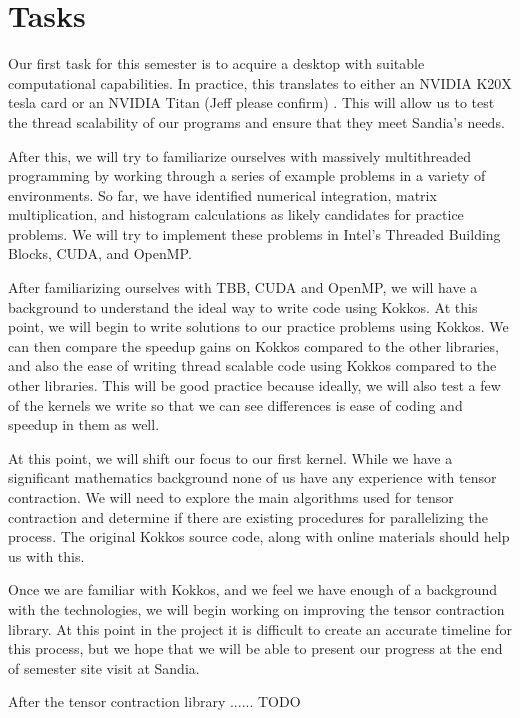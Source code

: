 \documentclass[proposal]{hmcclinic}
\begin{document}

\section{Tasks}

Our first task for this semester is to acquire a desktop with suitable
computational capabilities. In practice, this translates to either an NVIDIA
K20X tesla card or an NVIDIA Titan (Jeff please confirm) . This will allow us to test the thread
scalability of our programs and ensure that they meet Sandia's needs.

After this, we will try to familiarize ourselves with massively multithreaded
programming by working through a series of example problems in a variety of
environments. So far, we have identified numerical integration, matrix
multiplication, and histogram calculations as likely candidates for practice
problems. We will try to implement these problems in Intel's Threaded Building
Blocks, CUDA, and OpenMP.

After familiarizing ourselves with TBB, CUDA and OpenMP, we will have a
background to understand the ideal way to write code using Kokkos. At this
point, we will begin to write solutions to our practice problems using Kokkos.
We can then compare the speedup gains on Kokkos compared to the other
libraries, and also the ease of writing thread scalable code using Kokkos
compared to the other libraries. This will be good practice because ideally, we
will also test a few of the kernels we write so that we can see differences is
ease of coding and speedup in them as well.

At this point, we will shift our focus to our first kernel.
While we have a significant mathematics background none of us have any
experience with tensor contraction.  We will need to explore the main
algorithms used for tensor contraction and determine if there are existing
procedures for parallelizing the process. The original Kokkos source code,
along with online materials should help us with this.

Once we are familiar with Kokkos, and we feel we have enough of a background
with the technologies, we will begin working on improving the tensor
contraction library. At this point in the project it is difficult to create an accurate timeline
for this process, but we hope that we will be able to present our progress at 
the end of semester site visit at Sandia.

After the tensor contraction library ...... TODO
\end{document}

